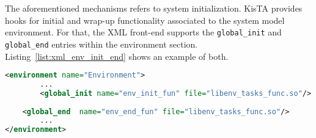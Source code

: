The aforementioned mechanisms refers to system initialization.
%
KisTA provides hooks for initial and wrap-up functionality associated to the system model environment.
%
For that, the XML front-end supports the \texttt{global\_init} and \texttt{global\_end} entries within the environment section.
Listing~\ref{list:xml_env_init_end} shows an example of both.

\begin{lstlisting}[language=XML, caption={Setting a global init functionality from the XML frontend.}, label=list:xml_env_init_end]
<environment name="Environment">
        ...
       	<global_init name="env_init_fun" file="libenv_tasks_func.so"/>
		
	<global_end  name="env_end_fun" file="libenv_tasks_func.so"/>
        ...
</environment>
\end{lstlisting}



